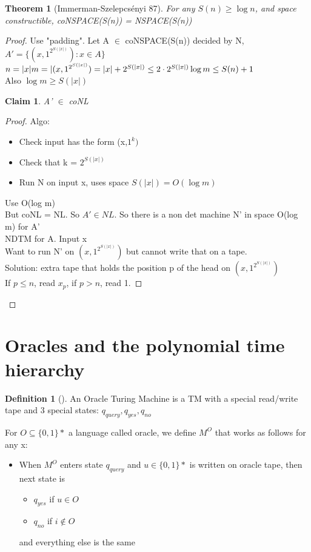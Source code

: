\documentclass{article}
\newtheorem{claim}{Claim}
\newtheorem{theorem}{Theorem}
\theoremstyle{definition}
\newtheorem{definition}{Definition}
\theoremstyle{remark}
\newcommand{\Thm}[3]{\begin{theorem}[#1]\label{#2}#3\end{theorem}}
\newcommand{\Def}[3]{\begin{definition}[#1]\label{#2}#3\end{definition}}
\newcommand{\Proof}[1]{\begin{proof}#1\end{proof}}
\begin{document}
\Thm{Immerman-Szelepcs\'enyi 87}{}{For any $S(n) \geq \log n$, and space constructible, coNSPACE(S(n)) = NSPACE(S(n))}
\Proof{Use "padding". Let A $\in$ coNSPACE(S(n)) decided by N, $A' = \{(x,1^{2^{S(|x|)}}):x\in A\}$\\
	$n = |x|\\
	m = |(x,1^{2^{S(|x|)}}) = |x| + 2^{S(|x|)} \leq 2\cdot2^{S(|x|)}\\
	\log m \leq S(n) + 1$\\
	Also $\log m \geq S(|x|)$
\begin{claim}
	A' $\in$ coNL
\end{claim}
\Proof{Algo: \begin{itemize}
		\item Check input has the form (x,$1^k)$
		\item Check that k = $2^{S(|x|)}$
		\item Run N on input x, uses space $S(|x|) = O(\log m)$
	\end{itemize}
	Use O(log m)\\
	But coNL = NL. So $A' \in NL$. So there is a non det machine N' in space O(log m) for A'\\
	
	NDTM for A. Input x\\
	Want to run N' on $(x,1^{2^{S(|x|)}})$ but cannot write that on a tape.\\
	Solution: extra tape that holds the position p of the head on $(x,1^{2^{S(|x|)}})$\\
	If $p \leq n$, read $x_p$, if $p > n$, read 1.
	}
}

\section{Oracles and the polynomial time hierarchy}
\Def{}{}{An Oracle Turing Machine is a TM with a special read/write tape and 3 special states: $q_{query},q_{yes},q_{no}$}

For $O\subseteq \{0,1\}*$ a language called oracle, we define $M^O$ that works as follows for any x:\begin{itemize}
	\item When $M^O$ enters state $q_{query}$ and $u \in \{0,1\}*$ is written on oracle tape, then next state is \begin{itemize}
			\item $q_{yes}$ if $u \in O$
			\item $q_{no}$ if $i \notin O$
		\end{itemize}
		and everything else is the same
\end{itemize}
\end{document}
